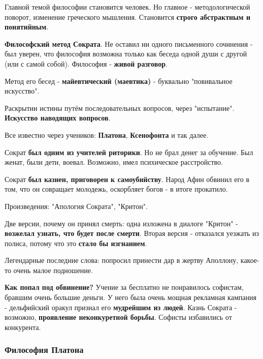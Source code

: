 \documentclass{article}
\begin{document}
\begin{flushleft}
\hfill

Главной темой философии становится человек. Но главное - методологической поворот, изменение греческого мышления. Становится \textbf{строго абстрактным и понятийным}.

\hfill

\textbf{Философский метод Сократа}. Не оставил ни одного письменного сочинения - был уверен, что философия возможна только как беседа одной души с другой (или с самой собой). Философия - \textbf{живой разговор}.

Метод его бесед - \textbf{майевтический (маевтика)} - буквально "повивальное искусство".

Раскрытии истины путём последовательных вопросов, через "испытание". \textbf{Искусство наводящих вопросов}.

\hfill

Все известно через учеников: \textbf{Платона}, \textbf{Ксенофонта} и так далее.

\hfill

Сократ \textbf{был одним из учителей риторики}. Но не брал денег за обучение. Был женат, были дети, воевал. Возможно, имел психическое расстройство.

\hfill

Сократ \textbf{был казнен, приговорен к самоубийству}. Народ Афин обвинил его в том, что он совращает молодежь, оскорбляет богов - в итоге прокатило.

Произведения: "Апология Сократа", "Критон".

Две версии, почему он принял смерть: одна изложена в диалоге "Критон" - \textbf{возжелал узнать, что будет после смерти}. Вторая версия - отказался уезжать из полиса, потому что это \textbf{стало бы изгнанием}.

\hfill

Легендарные последние слова: попросил принести дар в жертву Аполлону, какое-то очень малое подношение.

\hfill

\textbf{Как попал под обвинение?} Учение за бесплатно не понравилось софистам, бравшим очень большие деньги. У него была очень мощная рекламная кампания - дельфийский оракул признал его \textbf{мудрейшим из людей}. Казнь Сократа - возможно, \textbf{проявление неконкуретной борьбы}. Софисты избавились от конкурента.

\subsubsection{Философия Платона}


\end{flushleft}
\end{document}

